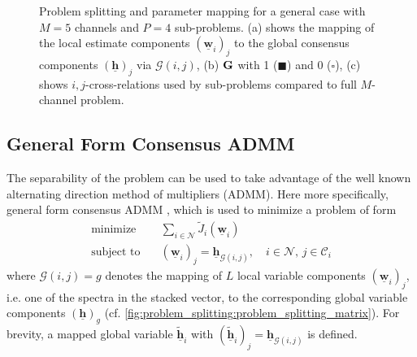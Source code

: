 \documentclass{article}
\newcommand{\hf}{\underline{\bm{h}}}
\newcommand{\wf}{\underline{\bm{w}}}
\newcommand{\Cset}{\mathcal{C}}
\newcommand{\Nset}{\mathcal{N}}
\begin{document}
\begin{figure}
    \centering
    \subfloat[][]{}
    \subfloat[][]{}
    \caption{Problem splitting and parameter mapping for a general case with \(M=5\) channels and \(P=4\) sub-problems. (a) shows the mapping of the local estimate components \((\wf_i)_j\) to the global consensus components \((\hf)_j\) via \(\mathcal{G}(i,j)\), (b) \(\bm{\mathrm{G}}\) with 1 (\(\blacksquare\)) and 0 (\(\square\)), (c) shows \(i,j\)-cross-relations used by sub-problems compared to full \(M\)-channel problem.}
    \label{fig:problem_splitting:problem_splitting_matrix}
\end{figure}

\subsection{General Form Consensus ADMM}
\label{ssec:general_consensus_admm}
The separability of the problem can be used to take advantage of the well known alternating direction method of multipliers (ADMM).
Here more specifically, general form consensus ADMM \cite{}, which is used to minimize a problem of form
\begin{align}
    \operatorname{minimize} \quad &\sum_{i \in \Nset} \tilde{J}_i(\wf_i)\\
    \text{subject to} \quad &(\wf_i)_j = \hf_{\mathcal{G}(i,j)},\quad i \in \Nset,\,j \in \Cset_i
\end{align}
where \(\mathcal{G}(i,j)=g\) denotes the mapping of \(L\) local variable components \((\wf_i)_j\), i.e. one of the spectra in the stacked vector, to the corresponding global variable components \((\hf)_g\) (cf. \autoref{fig:problem_splitting:problem_splitting_matrix}). For brevity, a mapped global variable \(\tilde{\hf}_i\) with \((\tilde{\hf}_i)_j = \hf_{\mathcal{G}(i,j)}\) is defined.
\end{document}
